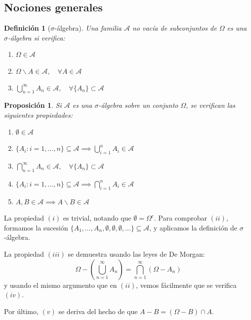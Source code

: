 \documentclass[11pt, a4paper]{article}
\makeatletter
\newif\IfInSansMode
\let\oldsf\sffamily
\renewcommand*{\sffamily}{\oldsf\mathversion{sans}\InSansModetrue}
\let\oldnorm\normalfont
\renewcommand*{\normalfont}{\oldnorm\InSansModefalse\mathversion{normal}}
\renewenvironment{proof}[1][\proofname] {\par\pushQED{\qed}\normalfont\topsep6\p@\@plus6\p@\relax\trivlist\item[\hskip\labelsep\itshape\sffamily#1\@addpunct{.}]\ignorespaces}{\popQED\endtrivlist\@endpefalse}
\theoremstyle{theorem-style}
\newtheorem{nprop}{Proposición}[section]
\theoremstyle{definition-style}
\newtheorem{ndef}{Definición}[section]
\theoremstyle{remark-style}
\theoremstyle{example-style}
\newenvironment{nlist}
{\begin{enumerate}
    \renewcommand\labelenumi{(\emph{\roman{enumi})}}}
  {\end{enumerate}}
\makeatother
\begin{document}

\subsection{Nociones generales}

\begin{ndef}[$\sigma$-álgebra] Una familia $\mathscr A$ no vacía de subconjuntos de $\Omega$ es una \mbox{$\sigma$-álgebra} si verifica:

  \begin{nlist}
  \item $\Omega \in \mathscr A$
  \item $\displaystyle \Omega \backslash A \in \mathscr A, \quad \forall A \in \mathscr A$
  \item $\displaystyle \bigcup_{n=1}^\infty A_n \in \mathscr A, \quad \forall \{A_n\} \subset \mathscr A$
  \end{nlist}
  
\end{ndef}

\begin{nprop}
  Si $\mathscr A$ es una $\sigma$-álgebra sobre un conjunto $\Omega$, se verifican las siguientes propiedades: 
  
  \begin{nlist}
  \item $\emptyset \in \mathscr A$
  \item $\displaystyle \{A_i : i = 1,\dots,n\} \subseteq \mathscr A \implies \bigcup_{i=1}^n A_i \in \mathscr A$
  \item $\displaystyle \bigcap_{n=1}^\infty A_n \in \mathscr A, \quad \forall \{A_n\} \subset \mathscr A$
  \item $\displaystyle \{A_i : i = 1,\dots,n\} \subseteq \mathscr A \implies \bigcap_{i=1}^n A_i \in \mathscr A$
  \item $A,B \in \mathscr A \implies A \backslash B \in \mathscr A$
  \end{nlist}
\end{nprop}

  \begin{proof}
    La propiedad $(i)$ es trivial, notando que $\emptyset = \Omega^c$. Para comprobar $(ii)$, formamos la sucesión $\{A_1,\dots,A_n,\emptyset,\emptyset, \emptyset, \dots\} \subseteq \mathscr A$, y aplicamos la definición de $\sigma$-álgebra.
    
    La propiedad $(iii)$ se demuestra usando las leyes de De Morgan: $$\Omega - \left( \bigcup_{n=1}^\infty A_n \right) = \bigcap_{n=1}^\infty (\Omega - A_n)$$ y usando el mismo argumento que en $(ii)$, vemos fácilmente que se verifica $(iv)$.
    
    Por último, $(v)$ se deriva del hecho de que $A - B = (\Omega - B) \cap A$.
  \end{proof}
\end{document}
